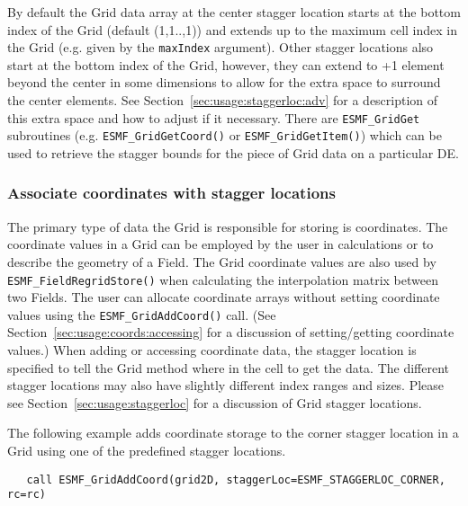    By default the Grid data array at the center stagger location
   starts at the bottom index of the Grid (default (1,1..,1)) and extends
   up to the maximum cell index in the Grid (e.g. given by the {\tt maxIndex} argument).
   Other stagger locations also start at the bottom index of the Grid, however,
   they can extend to +1 element beyond the center in some dimensions to allow
   for the extra space to surround the center elements. See Section~\ref{sec:usage:staggerloc:adv}
   for a description of this extra space and how to adjust if it necessary.
   There are {\tt ESMF\_GridGet} subroutines (e.g. {\tt ESMF\_GridGetCoord()} or {\tt ESMF\_GridGetItem()})
   which can be used to retrieve the stagger bounds for the piece of Grid data
   on a particular DE. 

  \subsubsection{Associate coordinates with stagger locations}
  
   The primary type of data the Grid is responsible for storing is coordinates.
   The coordinate values in a Grid can be employed by the user in calculations or
   to describe the geometry of a Field. The Grid coordinate values are also used by
   {\tt ESMF\_FieldRegridStore()} when calculating the interpolation
   matrix between two Fields. The user can allocate coordinate arrays without setting coordinate values
   using the {\tt ESMF\_GridAddCoord()} call. (See Section~\ref{sec:usage:coords:accessing} for a discussion of
   setting/getting coordinate values.) When adding or accessing
   coordinate data, the stagger location is specified to tell the Grid method
   where in the cell to get the data. The different stagger locations may also have slightly different
   index ranges and sizes.  Please see Section~\ref{sec:usage:staggerloc} for a discussion of
   Grid stagger locations.
  
   The following example adds coordinate storage to the corner stagger location in a Grid using one
   of the predefined stagger locations. 

 \begin{verbatim}
   call ESMF_GridAddCoord(grid2D, staggerLoc=ESMF_STAGGERLOC_CORNER, rc=rc)
 
\end{verbatim}
 
